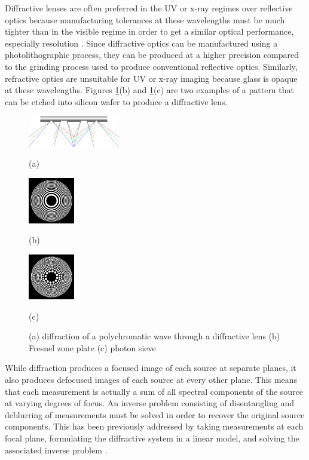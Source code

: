 \documentclass{article}
\begin{document}
Diffractive lenses are often preferred in the UV or x-ray
regimes over reflective optics because manufacturing tolerances at these
wavelengths must be much tighter than in the visible regime in order to get a
similar optical performance, especially resolution \cite{davila2011high}. Since
diffractive optics can be manufactured using a photolithographic process, they
can be produced at a higher precision compared to the grinding process used to
produce conventional reflective optics. Similarly, refractive optics are
unsuitable for UV or x-ray imaging because glass is opaque at these wavelengths.
Figures \ref{fig:diff_lens}(b) and \ref{fig:diff_lens}(c) are two examples of a
pattern that can be etched into silicon wafer to produce a diffractive lens.

\begin{figure}[htb]

\begin{minipage}[b]{0.48\linewidth}
  \centering
  \centerline{\includegraphics[width=4.0cm]{diffraction_ps_rgb}}
  \centerline{(a)}\medskip
\end{minipage}
\hfill
\begin{minipage}[b]{0.24\linewidth}
  \centering
  \centerline{\includegraphics[width=2.0cm]{zoneplate}}
  \centerline{(b)}\medskip
\end{minipage}
\hfill
\begin{minipage}[b]{0.24\linewidth}
  \centering
  \centerline{\includegraphics[width=2.0cm]{photonsieve}}
  \centerline{(c)}\medskip
\end{minipage}
\caption{(a) diffraction of a polychromatic wave through a diffractive lens (b) Fresnel zone
plate (c) photon sieve}
\label{fig:diff_lens}
%
\end{figure}

While diffraction produces a focused image of each source at separate
planes, it also produces defocused images of each source at every other plane.
This means that each measurement is actually a sum of all spectral components of
the source at varying degrees of focus. An inverse problem consisting of
disentangling and deblurring of measurements must be solved in order to
recover the original source components.  This has been
previously addressed by taking measurements at each focal plane, formulating the
diffractive system in a linear model, and solving the associated inverse problem
\cite{oktem2014icip}.
\end{document}

